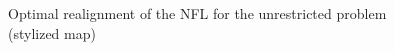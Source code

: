 \documentclass[12pt]{article}
\begin{document}
\begin{figure}
\begin{picture}
\end{picture}
\caption{Optimal realignment of the NFL
for the unrestricted problem
(stylized map)
 \label{map_int}}
\end{figure}
\end{document}

